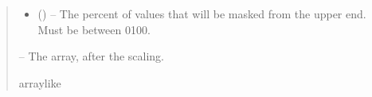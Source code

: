 \documentclass[letterpaper,11pt,english]{sphinxmanual}
\begin{document}
\begin{savenotes}
\begin{fulllineitems}
\begin{quote}
\begin{description}
\begin{itemize}
\item {} 
\sphinxAtStartPar
{} () – The percent of values that will be masked from the upper end. Must be
between 0\sphinxhyphen{}100.

\end{itemize}

\sphinxAtStartPar
{} – The array, after the scaling.

\sphinxAtStartPar
array\sphinxhyphen{}like

\end{description}\end{quote}

\end{fulllineitems}\end{savenotes}

\end{document}

